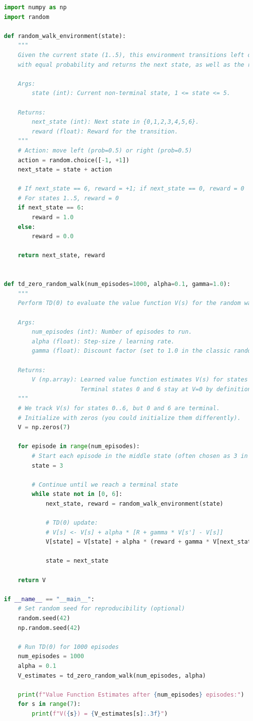 \begin{lstlisting}[language=Python]
import numpy as np
import random

def random_walk_environment(state):
    """
    Given the current state (1..5), this environment transitions left or right 
    with equal probability and returns the next state, as well as the reward.
    
    Args:
        state (int): Current non-terminal state, 1 <= state <= 5.
    
    Returns:
        next_state (int): Next state in {0,1,2,3,4,5,6}.
        reward (float): Reward for the transition.
    """
    # Action: move left (prob=0.5) or right (prob=0.5)
    action = random.choice([-1, +1])
    next_state = state + action

    # If next_state == 6, reward = +1; if next_state == 0, reward = 0
    # For states 1..5, reward = 0
    if next_state == 6:
        reward = 1.0
    else:
        reward = 0.0
    
    return next_state, reward


def td_zero_random_walk(num_episodes=1000, alpha=0.1, gamma=1.0):
    """
    Perform TD(0) to evaluate the value function V(s) for the random walk example.
    
    Args:
        num_episodes (int): Number of episodes to run.
        alpha (float): Step-size / learning rate.
        gamma (float): Discount factor (set to 1.0 in the classic random walk).
    
    Returns:
        V (np.array): Learned value function estimates V(s) for states s in [0..6].
                      Terminal states 0 and 6 stay at V=0 by definition.
    """
    # We track V(s) for states 0..6, but 0 and 6 are terminal.
    # Initialize with zeros (you could initialize them differently).
    V = np.zeros(7)

    for episode in range(num_episodes):
        # Start each episode in the middle state (often chosen as 3 in the random walk)
        state = 3

        # Continue until we reach a terminal state
        while state not in [0, 6]:
            next_state, reward = random_walk_environment(state)

            # TD(0) update:
            # V[s] <- V[s] + alpha * [R + gamma * V[s'] - V[s]]
            V[state] = V[state] + alpha * (reward + gamma * V[next_state] - V[state])

            state = next_state

    return V

if __name__ == "__main__":
    # Set random seed for reproducibility (optional)
    random.seed(42)
    np.random.seed(42)

    # Run TD(0) for 1000 episodes
    num_episodes = 1000
    alpha = 0.1
    V_estimates = td_zero_random_walk(num_episodes, alpha)

    print(f"Value Function Estimates after {num_episodes} episodes:")
    for s in range(7):
        print(f"V({s}) = {V_estimates[s]:.3f}")
\end{lstlisting}


